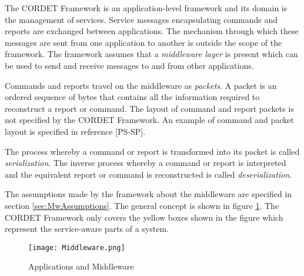 The CORDET Framework is an application-level framework and its domain is the management of services. Service messages encapsulating commands and reports are exchanged between applications. The mechanism through which these messages are sent from one application to another is outside the scope of the framework. The framework assumes that a \textit{middleware layer} is present which can be used to send and receive messages to and from other applications. 

Commands and reports travel on the middleware as \textit{packets}. A packet is an ordered sequence of bytes that contains all the information required to reconstruct a report or command. The layout of command and report packets is not specified by the CORDET Framework. An example of command and packet layout is specified in reference [PS-SP].

The process whereby a command or report is transformed into its packet is called \textit{serialization}. The inverse process whereby a command or report is interpreted and the equivalent report or command is reconstructed is called \textit{deserialization}.

The assumptions made by the framework about the middleware are specified in section \ref{sec:MwAssumptions}. The general concept is shown in figure \ref{fig:Middleware}. The CORDET Framework only covers the yellow boxes shown in the figure which represent the service-aware parts of a system.

\begin{figure}[ht]
 \centering
 \texttt{[image: Middleware.png]}
 \caption{Applications and Middleware}
 \label{fig:Middleware}
\end{figure}
